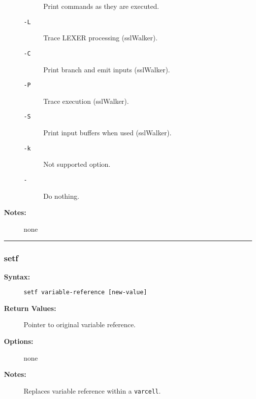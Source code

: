 \begin{description}
\begin{description}
Print commands as they are executed.

\item[{\tt -L}] \mbox{}

Trace LEXER processing (sslWalker).

\item[{\tt -C}] \mbox{}

Print branch and emit inputs (sslWalker).

\item[{\tt -P}] \mbox{}

Trace execution (sslWalker).

\item[{\tt -S}] \mbox{}

Print input buffers when used (sslWalker). 

\item[{\tt -k}] \mbox{}

Not supported option.

\item[{\tt -}] \mbox{}

Do nothing.

\end{description}


\item[{\bf Notes:}] \mbox{}

none  

\end{description}


\hrule
\subsubsection{setf}

\begin{description}
\item[{\bf Syntax:}] \mbox{}

{\tt setf variable-reference [new-value]}

\item[{\bf Return Values:}] \mbox{}

Pointer to original variable reference.

\item[{\bf Options:}] \mbox{}

none  

\item[{\bf Notes:}] \mbox{}

Replaces variable reference within a {\tt varcell}.

\end{description}


